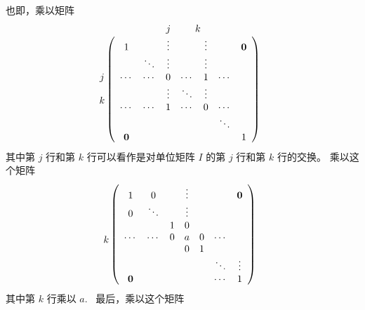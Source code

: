 也即，乘以矩阵
\[
\begin{array}{@{}c@{\,}c}
    & \begin{array}{@{}c@{\hspace{2.5em}}c@{}}
        j & k
      \end{array}
    \\
    \begin{array}{@{}c@{}} \\ j \\ \\ k \\ \\ \end{array}
    &
    \left(
    \begin{array}{ccccccc}
        1      &          & \vdots   &        & \vdots   &        &  \oo\\
               & \ddots   & \vdots   &        & \vdots   &        &            \\
        \cdots & \cdots   & 0        & \cdots & 1        & \cdots &            \\
               &          & \vdots   & \ddots & \vdots   &        &            \\
        \cdots & \cdots   & 1        & \cdots & 0        & \cdots &            \\
               &          &          &        &          & \ddots &            \\
        \oo &        &          &        &        &        & 1
    \end{array}
    \right)
\end{array}
\]
其中第 $j$ 行和第 $k$ 行可以看作是对单位矩阵 $I$ 的第 $j$ 行和第 $k$ 行的交换。
乘以这个矩阵
\[
\begin{array}{@{}c@{\,}c}
    \begin{array}{@{}c@{}} \\ \\ k \\ \\ \end{array}
    &
    \left(
    \begin{array}{ccccccc}
        1      &    0    &    &   \vdots     &          &          & \oo \\
       0       & \ddots   &    &    \vdots    &          &          &            \\
               &          & 1        & 0      &          &          &            \\
        \cdots & \cdots   & 0        & a      & 0        & \cdots   &            \\
               &          &          & 0      & 1        &          &            \\
               &          &          &        &    &   \ddots &   \vdots        \\
        \oo &      &          &       & &  \cdots  & 1
    \end{array}
    \right)
\end{array}
\]
其中第 $k$ 行乘以 $a$. ~最后，乘以这个矩阵

